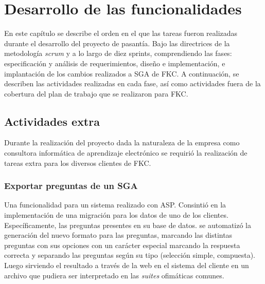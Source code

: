 \chapter{Desarrollo de las funcionalidades}
\thispagestyle{empty} %

En este capítulo se describe el orden en el que las tareas fueron realizadas durante el desarrollo del proyecto de pasantía. Bajo las directrices de la metodología \emph{scrum} y a lo largo de diez sprints, comprendiendo las fases: especificación y análisis de requerimientos, diseño e implementación, e implantación de los cambios realizados a \gls{SGA} de \gls{FKC}. A continuación, se describen las actividades realizadas en cada fase, así como actividades fuera de la cobertura del plan de trabajo que se realizaron para \gls{FKC}.












\section{Actividades extra} %
\label{sec:actividades_extra}

Durante la realización del proyecto dada la naturaleza de la empresa como consultora informática de aprendizaje electrónico se requirió la realización de tareas extra para los diversos clientes de \gls{FKC}.

	\subsection{Exportar preguntas de un SGA} %
	\label{sub:exportar_preguntas_de_un_sga}


	Una funcionalidad para un sistema realizado con \gls{ASP}. Consintió en la implementación de una migración para los datos de uno de los clientes. Específicamente, las preguntas presentes en su base de datos. se automatizó la generación del nuevo formato para las preguntas, marcando las distintas preguntas con sus opciones con un carácter especial marcando la respuesta correcta y separando las preguntas según su tipo (selección simple, compuesta). Luego sirviendo el resultado a través de la web en el sistema del cliente en un archivo que pudiera ser interpretado en las \emph{suites} ofimáticas comunes.

